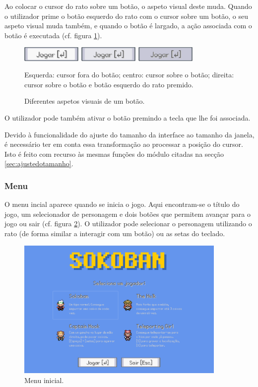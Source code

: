 \documentclass[a4paper]{article}
\begin{document}
Ao colocar o cursor do rato sobre um botão, o aspeto visual deste muda. Quando o utilizador prime o botão esquerdo do rato com o cursor sobre um botão, o seu aspeto visual muda também, e quando o botão é largado, a ação associada com o botão é executada (cf. figura \ref{fig:buttons}).

\begin{figure}[ht]
	\centering
	\includegraphics[width=0.8\textwidth]{images/buttons.png}
	\caption{Diferentes aspetos visuais de um botão.}
	\label{fig:buttons}
	\smallskip\small
	Esquerda: cursor fora do botão; centro: cursor sobre o botão; direita: cursor sobre o botão e botão esquerdo do rato premido.
\end{figure}

O utilizador pode também ativar o botão premindo a tecla que lhe foi associada.

Devido à funcionalidade do ajuste do tamanho da interface ao tamanho da janela, é necessário ter em conta essa transformação ao processar a posição do cursor. Isto é feito com recurso às mesmas funções do módulo  citadas na secção \ref{sec:ajustedotamanho}.

\subsubsection{Menu}

O menu incial aparece quando se inicia o jogo. Aqui encontram-se o título do jogo, um selecionador de personagem e dois botões que permitem avançar para o jogo ou sair (cf. figura \ref{fig:menu}). O utilizador pode selecionar o personagem utilizando o rato (de forma similar a interagir com um botão) ou as setas do teclado.

\begin{figure}[ht]
	\centering
	\includegraphics[width=0.9\textwidth]{images/menu.png}
	\caption{Menu inicial.}
	\label{fig:menu}
\end{figure}
\end{document}

